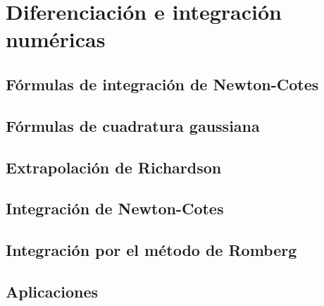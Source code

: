 \chapter{Diferenciación e integración numéricas}

\section{Fórmulas de integración de Newton-Cotes}

\section{Fórmulas de cuadratura gaussiana}

\section{Extrapolación de Richardson}

\section{Integración de Newton-Cotes}

\section{Integración por el método de Romberg}

\section{Aplicaciones}